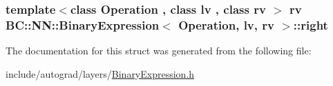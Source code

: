 \subsubsection[{\texorpdfstring{right}{right}}]{\setlength{\rightskip}{0pt plus 5cm}template$<$class Operation , class lv , class rv $>$ rv {\bf B\+C\+::\+N\+N\+::\+Binary\+Expression}$<$ Operation, lv, rv $>$\+::right}\hypertarget{structBC_1_1NN_1_1BinaryExpression_aecdf8d119adbb08f4b1aa7123b6bbce2}{}\label{structBC_1_1NN_1_1BinaryExpression_aecdf8d119adbb08f4b1aa7123b6bbce2}


The documentation for this struct was generated from the following file\+:\begin{DoxyCompactItemize}
\item 
include/autograd/layers/\hyperlink{BinaryExpression_8h}{Binary\+Expression.\+h}\end{DoxyCompactItemize}
